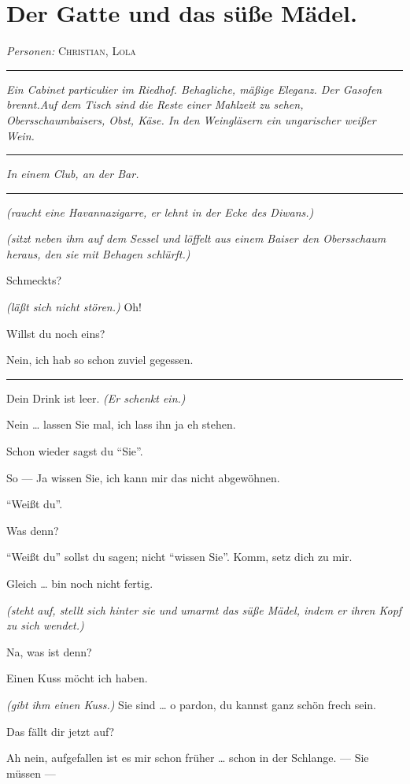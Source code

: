 \documentclass[
	final,
	a4paper,
	ngerman,
	mpinclude = true, %
	twoside = true,
	open = right,
	cleardoublepage = plain,
	DIV = 13,
	BCOR = 1cm,
	titlepage = firstiscover,
	]{scrbook}
\newcommand{\scene}{\section}
\newcommand{\direction}[1]{\textit{(#1)}}
\newcommand{\setting}[1]{\vspace{-0.5\baselineskip}\centering\textit{#1}}
\newenvironment{deletion}{%
		\vspace{0.25\baselineskip}
		\hrule
		\vspace{0.25\baselineskip}
		\color{darkgray}
	}{
		\color{black}
		\vspace{0.25\baselineskip}
		\hrule 
		\vspace{0.25\baselineskip}
	}
\newcommand{\characterlist}[1]{{\begin{center}\textit{Personen:} #1\end{center}}}
\newcommand{\thecharacter}[1]{\textup{\textsc{#1}}\xspace}
\newcommand{\thegatte}{\thecharacter{Christian}}
\newcommand{\thesuesse}{\thecharacter{Lola}}
\newcommand{\character}[1]{\item[#1:]}
\newcommand{\gatte}{\character{\thegatte}}
\newcommand{\suesse}{\character{\thesuesse}}
\begin{document}
\scene{Der Gatte und das süße Mädel.}
\characterlist{\thegatte, \thesuesse}
\begin{deletion}
\setting{Ein Cabinet particulier im Riedhof. Behagliche, mäßige Eleganz. Der Gasofen brennt.Auf dem Tisch sind die Reste einer Mahlzeit zu sehen, Obersschaumbaisers, Obst, Käse. In den Weingläsern ein ungarischer weißer Wein.}
\end{deletion}
\setting{In einem Club, an der Bar.}
\begin{play}
	\begin{deletion}
	\gatte
	\direction{raucht eine Havannazigarre, er lehnt in der Ecke des Diwans.}

	\suesse
	\direction{sitzt neben ihm auf dem Sessel und löffelt aus einem Baiser den Obersschaum heraus, den sie mit Behagen schlürft.}

	\gatte
	Schmeckts?

	\suesse
	\direction{läßt sich nicht stören.} Oh!

	\gatte
	Willst du noch eins?

	\suesse
	Nein, ich hab so schon zuviel gegessen.
	\end{deletion}

	\gatte
	Dein Drink ist leer. \direction{Er schenkt ein.}

	\suesse
	Nein \ldots{} lassen Sie mal, ich lass ihn ja eh stehen.

	\gatte
	Schon wieder sagst du \enquote{Sie}.

	\suesse
	So --- Ja wissen Sie, ich kann mir das nicht abgewöhnen.

	\gatte
	\enquote{Weißt du}.

	\suesse
	Was denn?

	\gatte
	\enquote{Weißt du} sollst du sagen; nicht \enquote{wissen Sie}. Komm, setz dich zu mir.

	\suesse
	Gleich \ldots{} bin noch nicht fertig.

	\gatte
	\direction{steht auf, stellt sich hinter sie und umarmt das süße Mädel, indem er ihren Kopf zu sich wendet.}

	\suesse
	Na, was ist denn?

	\gatte
	Einen Kuss möcht ich haben.

	\suesse
	\direction{gibt ihm einen Kuss.} Sie sind \ldots{} o pardon, du kannst ganz schön frech sein.

	\gatte
	Das fällt dir jetzt auf?

	\suesse
	Ah nein, aufgefallen ist es mir schon früher \ldots{} schon in der Schlange. --- Sie müssen ---


\end{play}
\end{document}
